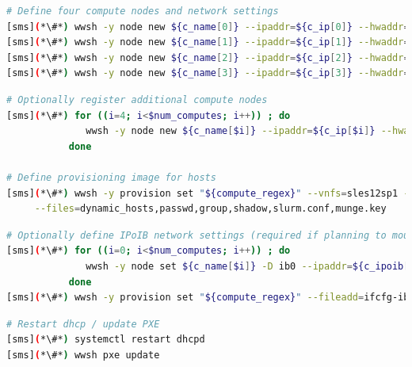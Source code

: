 \documentclass[letterpaper]{article}
\begin{document}
\begin{lstlisting}[language=bash,keywords={},upquote=true,basicstyle=\footnotesize\ttfamily]
# Define four compute nodes and network settings 
[sms](*\#*) wwsh -y node new ${c_name[0]} --ipaddr=${c_ip[0]} --hwaddr=${c_mac[0]} -D ${eth_provision}
[sms](*\#*) wwsh -y node new ${c_name[1]} --ipaddr=${c_ip[1]} --hwaddr=${c_mac[1]} -D ${eth_provision}
[sms](*\#*) wwsh -y node new ${c_name[2]} --ipaddr=${c_ip[2]} --hwaddr=${c_mac[2]} -D ${eth_provision}
[sms](*\#*) wwsh -y node new ${c_name[3]} --ipaddr=${c_ip[3]} --hwaddr=${c_mac[3]} -D ${eth_provision}
\end{lstlisting}




\begin{lstlisting}[language=bash,keywords={},upquote=true,basicstyle=\footnotesize\ttfamily]
# Optionally register additional compute nodes
[sms](*\#*) for ((i=4; i<$num_computes; i++)) ; do
              wwsh -y node new ${c_name[$i]} --ipaddr=${c_ip[$i]} --hwaddr=${c_mac[$i]} -D ${eth_provision}
           done

# Define provisioning image for hosts
[sms](*\#*) wwsh -y provision set "${compute_regex}" --vnfs=sles12sp1 --bootstrap=`uname -r` \
     --files=dynamic_hosts,passwd,group,shadow,slurm.conf,munge.key
\end{lstlisting}

\begin{lstlisting}[language=bash,keywords={},upquote=true,basicstyle=\footnotesize\ttfamily]
# Optionally define IPoIB network settings (required if planning to mount Lustre over IB)
[sms](*\#*) for ((i=0; i<$num_computes; i++)) ; do
              wwsh -y node set ${c_name[$i]} -D ib0 --ipaddr=${c_ipoib[$i]} --netmask=${ipoib_netmask}
           done
[sms](*\#*) wwsh -y provision set "${compute_regex}" --fileadd=ifcfg-ib0.ww
\end{lstlisting}



\clearpage
\begin{lstlisting}[language=bash,keywords={},upquote=true,basicstyle=\footnotesize\ttfamily]
# Restart dhcp / update PXE
[sms](*\#*) systemctl restart dhcpd
[sms](*\#*) wwsh pxe update
\end{lstlisting}
\end{document}
